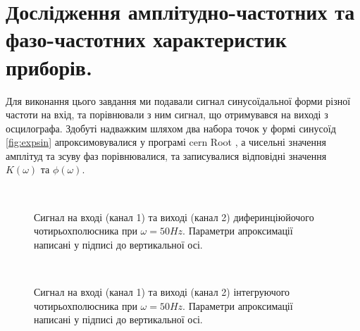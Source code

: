 \section{Дослідження амплітудно-частотних та фазо-частотних характеристик приборів.}

Для виконання цього завдання ми подавали сигнал синусоїдальної форми різної частоти на вхід, та порівнювали з ним сигнал, що отримувався на виході з осцилографа. Здобуті надважким шляхом два набора точок у формі синусоїд \ref{fig:expsin} апроксимовувалися у програмі cern Root \cite{root}, а чисельні значення амплітуд та зсуву фаз порівнювалися, та записувалися відповідні значення $K(\omega)$ та $\phi(\omega)$. 

\begin{figure}[h]
	 \\
	\caption{Сигнал на вході (канал 1) та виході (канал 2) диферинціюйочого чотирьохполюсника при $\omega = 50Hz$. Параметри апроксимації написані у підписі до вертикальної осі.}
	\label{fig:expsinD}
\end{figure}

\begin{figure}[h]
	 \\
	\caption{Сигнал на вході (канал 1) та виході (канал 2) інтегруючого чотирьохполюсника при $\omega = 50Hz$. Параметри апроксимації написані у підписі до вертикальної осі.}
	\label{fig:expsinI}
\end{figure}

